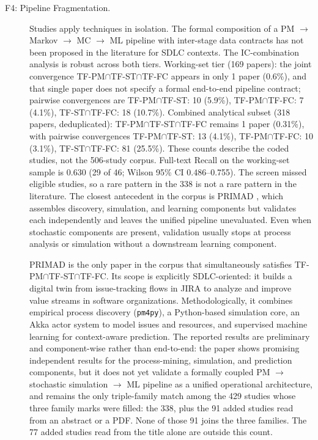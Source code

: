 \begin{description}
\item[F4: Pipeline Fragmentation.]
Studies apply techniques in isolation. The formal composition of a
PM $\rightarrow$ Markov $\rightarrow$ MC $\rightarrow$ ML pipeline with
inter-stage data contracts has not been proposed in the literature for SDLC
contexts. The IC-combination analysis is robust across both tiers.
Working-set tier (169 papers): the joint convergence
TF-PM$\cap$TF-ST$\cap$TF-FC appears in only 1 paper (0.6\%), and that single
paper does not specify a formal end-to-end pipeline contract; pairwise
convergences are TF-PM$\cap$TF-ST: 10 (5.9\%), TF-PM$\cap$TF-FC: 7 (4.1\%),
TF-ST$\cap$TF-FC: 18 (10.7\%). Combined analytical subset (318 papers,
deduplicated): TF-PM$\cap$TF-ST$\cap$TF-FC remains 1 paper (0.31\%), with pairwise
convergences TF-PM$\cap$TF-ST: 13 (4.1\%), TF-PM$\cap$TF-FC: 10 (3.1\%),
TF-ST$\cap$TF-FC: 81 (25.5\%). These counts describe the coded studies, not the 506-study corpus. Full-text
Recall on the working-set sample is 0.630 (29 of 46; Wilson 95\% CI
0.486--0.755). The screen missed eligible studies, so a rare pattern in the
338 is not a rare pattern in the literature.
The closest antecedent
in the corpus is PRIMAD \cite{guinea2025}, which assembles discovery,
simulation, and learning components but validates each independently and
leaves the unified pipeline unevaluated. Even when stochastic components are
present, validation usually stops at process analysis or simulation without
a downstream learning component.

PRIMAD is the only paper in the corpus that simultaneously satisfies
TF-PM$\cap$TF-ST$\cap$TF-FC. Its scope is explicitly SDLC-oriented: it builds a
digital twin from issue-tracking flows in JIRA to analyze and improve value
streams in software organizations. Methodologically, it combines empirical
process discovery (\texttt{pm4py}), a Python-based simulation core, an Akka
actor system to model issues and resources, and supervised machine learning
for context-aware prediction. The reported results are preliminary and
component-wise rather than end-to-end: the paper shows promising independent
results for the process-mining, simulation, and prediction components, but it
does not yet validate a formally coupled PM $\rightarrow$ stochastic
simulation $\rightarrow$ ML pipeline as a unified operational architecture,
and remains the only triple-family match among the 429 studies whose three
family marks were filled: the 338, plus the 91 added studies read from an
abstract or a PDF. None of those 91 joins the three families. The 77 added
studies read from the title alone are outside this count.


\end{description}
